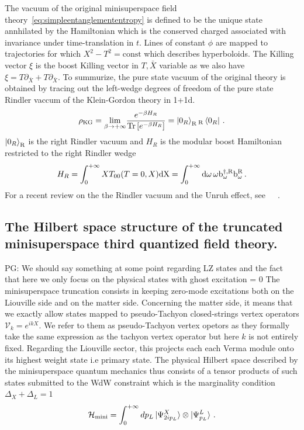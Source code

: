 \documentclass[a4paper]{article}
\newcommand{\purple}[1]{{\color{purple} #1 \color{black}}}
\newcommand{\PG}[1]{{\purple{PG: #1}}} %
\begin{document}
The vacuum of the original minisuperspace field theory~\eqref{eq:simpleentanglemententropy} is defined to be the unique state annhilated by the Hamiltonian which is the conserved charged associated with invariance under time-translation in $t$. Lines of constant $\phi$ are mapped to trajectories for which $X^2-T^2=\text{const}$ which describes hyperboloids. The Killing vector $\xi$ is the boost Killing vector in $T,\bar{X}$ variable as we also have $\xi = T\partial_{\bar{X}} + T\partial_{\bar{X}}$. To summurize, the pure state vacuum of the original theory is obtained by tracing out the left-wedge degrees of freedom of the pure state Rindler vaccum of the Klein-Gordon theory in 1+1d. 
\begin{equation}
  \rho_{\rm{KG}} = \underset{\beta \to +\infty}{\lim}\frac{e^{-\beta H_{R}}}{\text{Tr}\left[e^{-\beta H_{R}}\right]} = \ket{0_R}_{\rm{R}} {}_{\rm{R}}\bra{0_R}\,.
\end{equation}
$\ket{0_R}_{\rm{R}}$ is the right Rindler vacuum and $H_{R}$ is the modular boost Hamiltonian restricted to the right Rindler wedge
\begin{equation}
  H_R = \int_{0}^{+\infty} X T_{00}(T=0,X) \rm{d}X = \int_{0}^{+\infty} \rm{d}\omega \,\omega b_{\omega}^{\dagger, R} b_{\omega}^{R}\,. 
\end{equation}
For a recent review on the the Rindler vacuum and the Unruh effect, see~\cite{Crispino_2008}~\cite{Higuchi_2017}~\cite{Birrell:1982ix}.
\subsection{The Hilbert space structure of the truncated minisuperspace third quantized field theory.}
\PG{We should say something at some point regarding LZ states and the fact that here we only focus on the physical states with ghost excitation = 0}
The minisuperspace truncation consists in keeping zero-mode excitations both on the Liouville side and on the matter side. Concerning the matter side, it means that we exactly allow states mapped to pseudo-Tachyon closed-strings vertex operators $\mathcal{V}_k = e^{i k X}$. We refer to them as pseudo-Tachyon vertex opetors as they formally take the same expression as the tachyon vertex operator but here $k$ is not entirely fixed. Regarding the Liouville sector, this projects each each Verma module onto its highest weight state i.e primary state. The physical Hilbert space described by the minisuperspace quantum mechanics thus consists of a tensor products of such states submitted to the WdW constraint which is the marginality condition $\Delta_X + \Delta_L =1$
\begin{equation}
  \mathcal{H}_{\text{mini}} = \int_{0}^{+\infty} dp_L \ket{\Psi^{X}_{2i p_L}} \otimes \ket{\Psi^{L}_{p_L}}\,.
\end{equation}
\end{document}
